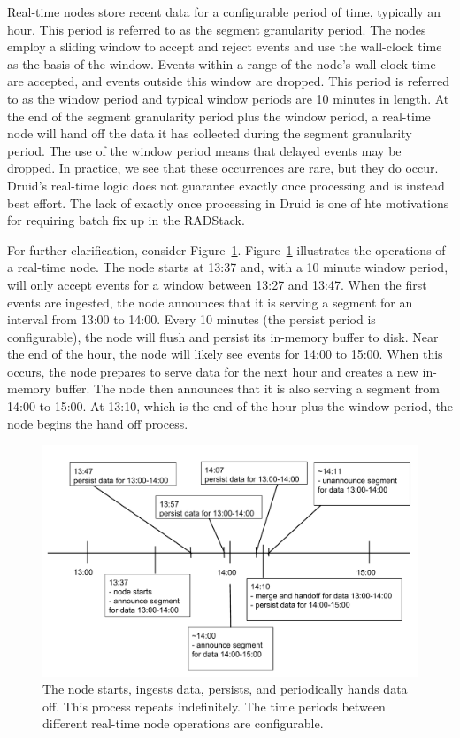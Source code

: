 \documentclass{vldb}
\begin{document}
{Real-time nodes store recent data for a configurable period of time, typically
an hour. This period is referred to as the segment granularity period. The
nodes employ a sliding window to accept and reject events and use the
wall-clock time as the basis of the window. Events within a range of the node’s
wall-clock time are accepted, and events outside this window are dropped. This
period is referred to as the window period and typical window periods are 10
minutes in length. At the end of the segment granularity period plus the window
period, a real-time node will hand off the data it has collected during the
segment granularity period. The use of the window period means that delayed
events may be dropped. In practice, we see that these occurrences are rare, but
they do occur. Druid's real-time logic does not guarantee exactly once
processing and is instead best effort. The lack of exactly once processing in
Druid is one of hte motivations for requiring batch fix up in the RADStack.

For further clarification, consider Figure~\ref{fig:realtime_timeline}.
Figure~\ref{fig:realtime_timeline} illustrates the operations of a real-time
node. The node starts at 13:37 and, with a 10 minute window period, will only
accept events for a window between 13:27 and 13:47.  When the first events are
ingested, the node announces that it is serving a segment for an
interval from 13:00 to 14:00. Every 10 minutes (the persist period is
configurable), the node will flush and persist its in-memory buffer to disk.
Near the end of the hour, the node will likely see events for 14:00 to 15:00.
When this occurs, the node prepares to serve data for the next hour and creates
a new in-memory buffer.  The node then announces that it is also serving a
segment from 14:00 to 15:00.  At 13:10, which is the end of the hour plus the
window period, the node begins the hand off process.

\begin{figure}
\centering
\includegraphics[width = 4.5in]{realtime_timeline}
\caption{The node starts, ingests data, persists, and periodically hands data
off. This process repeats indefinitely. The time periods between different
real-time node operations are configurable.}
\label{fig:realtime_timeline}
\end{figure}

}
\end{document}
